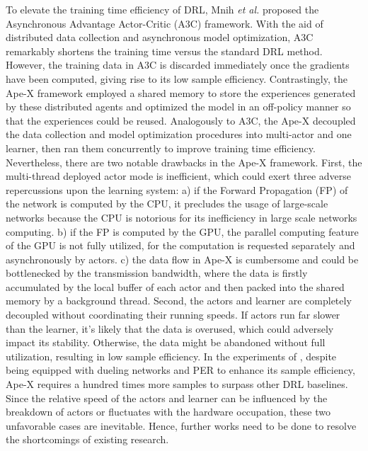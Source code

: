 \documentclass[journal]{IEEEtran}
\begin{document}
 To elevate the training time efficiency of DRL, Mnih \textit{et al.} \cite{A3C} proposed the Asynchronous Advantage Actor-Critic (A3C) framework. With the aid of distributed data collection and asynchronous model optimization, A3C remarkably shortens the training time versus the standard DRL method. However, the training data in A3C is discarded immediately once the gradients have been computed, giving rise to its low sample efficiency. Contrastingly, the Ape-X\cite{apex} framework employed a shared memory to store the experiences generated by these distributed agents and optimized the model in an off-policy manner so that the experiences could be reused. Analogously to A3C, the Ape-X decoupled the data collection and model optimization procedures into multi-actor and one learner, then ran them concurrently to improve training time efficiency. Nevertheless, there are two notable drawbacks in the Ape-X framework. First, the multi-thread deployed actor mode is inefficient, which could exert three adverse repercussions upon the learning system: a) if the Forward Propagation (FP) of the network is computed by the CPU, it precludes the usage of large-scale networks because the CPU is notorious for its inefficiency in large scale networks computing. b) if the FP is computed by the GPU, the parallel computing feature of the GPU is not fully utilized, for the computation is requested separately and asynchronously by actors. c) the data flow in Ape-X is cumbersome and could be bottlenecked by the transmission bandwidth, where the data is firstly accumulated by the local buffer of each actor and then packed into the shared memory by a background thread. Second, the actors and learner are completely decoupled without coordinating their running speeds. If actors run far slower than the learner, it’s likely that the data is overused, which could adversely impact its stability. Otherwise, the data might be abandoned without full utilization, resulting in low sample efficiency. In the experiments of \cite{apex}, despite being equipped with dueling networks and PER to enhance its sample efficiency, Ape-X requires a hundred times more samples to surpass other DRL baselines. Since the relative speed of the actors and learner can be influenced by the breakdown of actors or fluctuates with the hardware occupation\cite{apex}, these two unfavorable cases are inevitable. Hence, further works need to be done to resolve the shortcomings of existing research.
\end{document}

